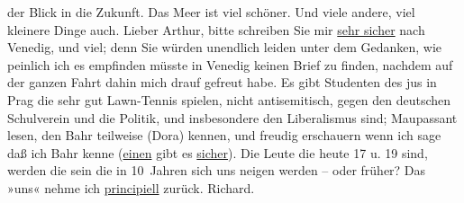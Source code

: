 \begin{ledgroupsized}[t]{13cm}
                    der Blick in die Zukunft.\pend
           \pstart
           Das Meer ist viel schöner. Und viele andere, viel kleinere Dinge auch. Lieber
                    Arthur, bitte schreiben Sie mir \uline{sehr sicher} nach
                        Venedig, und viel; denn Sie würden
                    unendlich leiden unter dem Gedanken, wie peinlich ich es empfinden müsste in
                        Venedig keinen Brief {\pb}zu finden, nachdem auf der
                    ganzen Fahrt dahin mich drauf gefreut habe.\pend
           \pstart
           Es gibt Studenten des jus in Prag die sehr
                    gut Lawn-Tennis spielen, nicht antisemitisch, gegen den deutschen Schulverein und die Politik, und insbesondere den
                    Liberalismus sind; Maupassant lesen, den
                        Bahr teilweise (Dora) kennen, und freudig erschauern wenn ich sage daß ich
                        Bahr kenne (\uline{einen} gibt es \uline{sicher}). Die Leute die
                    heute 17 u. 19 sind, werden die sein die in 10 Jahren sich uns neigen werden –
                    oder früher? Das »uns« nehme ich \uline{principiell}
                    zurück. \spacefill\mbox{Richard.}\pend
           
         
         \endnumbering{}\end{ledgroupsized}  \newcommand{\dateiname}{L00388}\newcommand{\titel}{Richard Beer-Hofmann an Arthur Schnitzler, 20. 10. 1894}\newcommand{\editorInnen}{ Martin Anton Müller und Gerd-Hermann Susen}
      